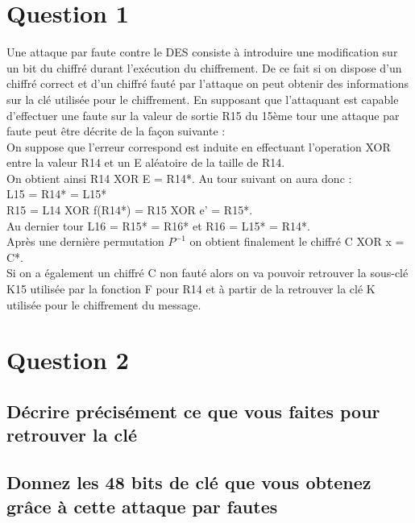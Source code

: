\documentclass[a4paper,11pt]{article}
\title{\vspace{13em}{\huge Calcul sécurisé - Contrôle continu}}
\begin{document}
	
	\clearpage
	\maketitle\vspace{13em}
	\newpage
	\tableofcontents
	\newpage\clearpage{}
	
	\section{Question 1}
	Une attaque par faute contre le DES consiste à introduire une modification sur un bit du chiffré durant l'exécution du chiffrement.
	De ce fait si on dispose d'un chiffré correct et d'un chiffré fauté par l'attaque on peut obtenir des informations sur la clé utilisée pour le chiffrement.
	En supposant que l'attaquant est capable d'effectuer une faute sur la valeur de sortie R15 du 15ème tour une attaque par faute peut être décrite de la façon suivante :\\
	On suppose que l'erreur correspond est induite en effectuant l'operation XOR entre la valeur R14 et un E aléatoire de la taille de R14.\\
	On obtient ainsi R14 XOR E = R14*.
	Au tour suivant on aura donc :\\
		L15 = R14* = L15*\\
		R15 = L14 XOR f(R14*) = R15 XOR e' = R15*.\\
	Au dernier tour L16 = R15* = R16* et R16 = L15* = R14*.\\
	Après une dernière permutation $P^{-1}$ on obtient finalement le chiffré C XOR x = C*.\\
	Si on a également un chiffré C non fauté alors on va pouvoir retrouver la sous-clé K15 utilisée par la fonction F pour R14 et à partir de la retrouver la clé K utilisée pour le chiffrement du message.
		
	\section{Question 2}
	\subsection{Décrire précisément ce que vous faites pour retrouver la clé}
	\subsection{Donnez les 48 bits de clé que vous obtenez grâce à cette attaque par fautes}
	
\end{document}
